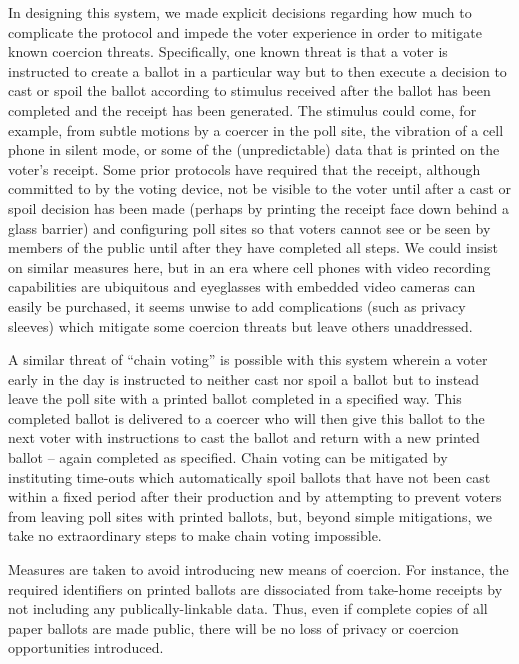 \label{sec:coercion}

In designing this system, we made explicit decisions regarding how much to complicate the protocol and impede the voter experience in order to mitigate known coercion threats.  Specifically, one known threat is that a voter is instructed to create a ballot in a particular way but to then execute a decision to cast or spoil the ballot according to stimulus received after the ballot has been completed and the receipt has been generated.  The stimulus could come, for example, from subtle motions by a coercer in the poll site, the vibration of a cell phone in silent mode, or some of the (unpredictable) data that is printed on the voter’s receipt.  Some prior protocols have required that the receipt, although committed to by the voting device, not be visible to the voter until after a cast or spoil decision has been made (perhaps by printing the receipt face down behind a glass barrier) and configuring poll sites so that voters cannot see or be seen by members of the public until after they have completed all steps.  We could insist on similar measures here, but in an era where cell phones with video recording capabilities are ubiquitous and eyeglasses with embedded video cameras can easily be purchased, it seems unwise to add complications (such as privacy sleeves) which mitigate some coercion threats but leave others unaddressed.

A similar threat of ``chain voting'' is possible with this system wherein a voter early in the day is instructed to neither cast nor spoil a ballot but to instead leave the poll site with a printed ballot completed in a specified way.  This completed ballot is delivered to a coercer who will then give this ballot to the next voter with instructions to cast the ballot and return with a new printed ballot – again completed as specified.  Chain voting can be mitigated by instituting time-outs which automatically spoil ballots that have not been cast within a fixed period after their production and by attempting to prevent voters from leaving poll sites with printed ballots, but, beyond simple mitigations, we take no extraordinary steps to make chain voting impossible.  

Measures are taken to avoid introducing new means of coercion.  For instance, the required identifiers on printed ballots are dissociated from take-home receipts by not including any publically-linkable data.  Thus, even if complete copies of all paper ballots are made public, there will be no loss of privacy or coercion opportunities introduced.

